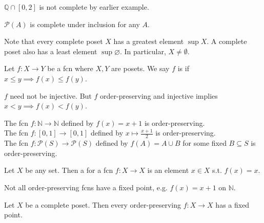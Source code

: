 \begin{example}
    $\mathbb{Q} \cap [0, 2]$ is not complete by earlier example.
\end{example}

\begin{example}
    $\mathcal P(A)$ is complete under inclusion for any $A$.
\end{example}

\begin{remark}
    Note that every complete poset $X$ has a greatest element $\sup X$.
    A complete poset also has a least element $\sup \varnothing$.
    In particular, $X \neq \emptyset$.
\end{remark}

\begin{definition}
    Let $f \colon X \to Y$ be a fcn where $X, Y$ are posets.
    We say $f$ is  if $x \leq y \implies f(x) \leq f(y)$.
\end{definition}

\begin{note}
    $f$ need not be injective.
    But $f$ order-preserving and injective implies $x < y \implies f(x) < f(y)$.
\end{note}

\begin{example}
    The fcn $f \colon \mathbb N \to \mathbb N$ defined by $f(x) = x + 1$ is order-preserving. \\
    The fcn $f \colon [0,1] \to [0,1]$ defined by $x \mapsto \frac{x+1}{2}$ is order-preserving. \\
    The fcn $f \colon \mathcal P(S) \to \mathcal P(S)$ defined by $f(A) = A \cup B$ for some fixed $B \subseteq S$ is order-preserving.
\end{example}

\begin{definition}
    Let $X$ be any set.
    Then a  for a fcn $f : X \to X$ is an element $x \in X$ s.t. $f(x) = x$.
\end{definition}

Not all order-preserving fcns have a fixed point, e.g. $f(x) = x + 1$ on $\mathbb N$.

\begin{theorem} \label{thm:fixed}
    Let $X$ be a complete poset.
    Then every order-preserving $f \colon X \to X$ has a fixed point.
\end{theorem}

